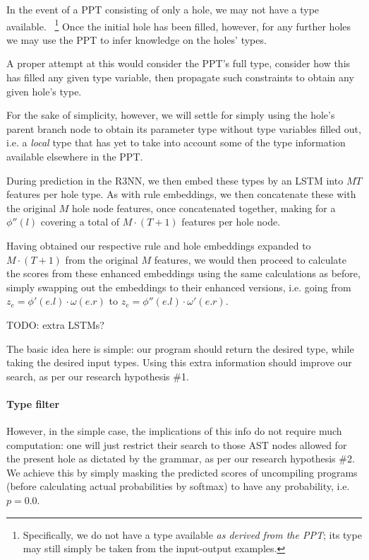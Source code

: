 \documentclass{article}
\begin{document}
\begin{itemize}
    In the event of a PPT consisting of only a hole,
    we may not have a type available.%
    ~\footnote{
        Specifically, we do not have a type available \emph{as derived from the PPT};
        its type may still simply be taken from the input-output examples.
    }
    Once the initial hole has been filled, however,
    for any further holes we may use the PPT to infer knowledge on the holes' types.

    A proper attempt at this would consider the PPT's full type,
    consider how this has filled any given type variable,
    then propagate such constraints to obtain any given hole's type.

    For the sake of simplicity, however, we will settle for simply using the hole's
    parent branch node to obtain its parameter type without type variables filled out,
    i.e. a \emph{local} type that has yet to take into account some of the type information available elsewhere in the PPT.

    During prediction in the R3NN, we then embed these types by an LSTM into $MT$ features per hole type.
    As with rule embeddings, we then concatenate these with the original $M$ hole node features,
    once concatenated together, making for a $\phi''(l)$ covering a total of $M \cdot (T+1)$ features per hole node.

\end{itemize}

Having obtained our respective rule and hole embeddings expanded to $M \cdot (T+1)$ from the original $M$ features,
we would then proceed to calculate the scores from these enhanced embeddings using the same calculations as before,
simply swapping out the embeddings to their enhanced versions,
i.e. going from $z_e = \phi'(e.l) \cdot \omega(e.r)$ to $z_e = \phi''(e.l) \cdot \omega'(e.r)$.

TODO: extra LSTMs?

The basic idea here is simple: our program should return the desired type, while taking the desired input types.
Using this extra information should improve our search,
as per our research hypothesis \#1.

\paragraph{Type filter} \label{sec:filter}

However, in the simple case, the implications of this info do not require much computation:
one will just restrict their search to those AST nodes allowed for the present hole as dictated by the grammar,
as per our research hypothesis \#2.
We achieve this by simply masking the predicted scores of uncompiling programs
(before calculating actual probabilities by softmax) to have any probability, i.e. $p=0.0$.
\end{document}
